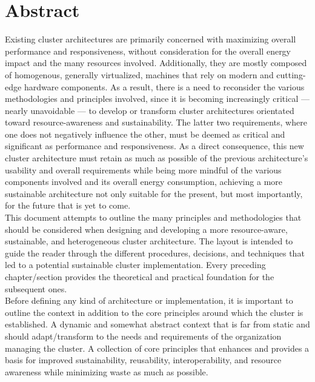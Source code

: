 \chapter*{Abstract}
\label{abtract}


Existing cluster architectures are primarily concerned with maximizing overall
performance and responsiveness, without consideration for the overall energy impact
and the many resources involved. Additionally, they are mostly composed of homogenous,
generally virtualized, machines that rely on modern and cutting-edge hardware components.
As a result, there is a need to reconsider the various methodologies and principles
involved, since it is becoming increasingly critical --- nearly unavoidable ---
to develop or transform cluster architectures orientated toward resource-awareness
and sustainability. The latter two requirements, where one does not negatively
influence the other, must be deemed as critical and significant as performance and
responsiveness. As a direct consequence, this new cluster architecture must retain
as much as possible of the previous architecture's usability and overall requirements
while being more mindful of the various components involved and its overall energy
consumption, achieving a more sustainable architecture not only suitable for the
present, but most importantly, for the future that is yet to come. \\ %

This document attempts to outline the many principles and methodologies that should
be considered when designing and developing a more resource-aware, sustainable, and
heterogeneous cluster architecture. The layout is intended to guide the reader
through the different procedures, decisions, and techniques that led to a
potential sustainable cluster implementation. Every preceding chapter/section provides
the theoretical and practical foundation for the subsequent ones. \\ %

Before defining any kind of architecture or implementation, it is important to outline
the context in addition to the core principles around which the cluster is established.
A dynamic and somewhat abstract context that is far from static and should adapt/transform
to the needs and requirements of the organization managing the cluster. A collection
of core principles that enhances and provides a basis for improved sustainability,
reusability, interoperability, and resource awareness while minimizing waste as
much as possible. \\ %

